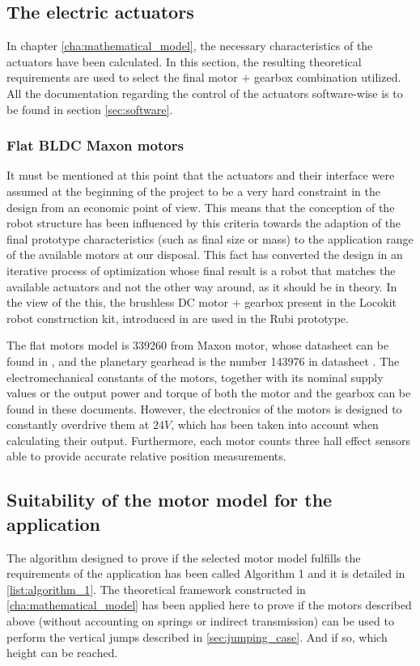 
\subsection{The electric actuators} %
\label{sub:electric_actuators}
In chapter \ref{cha:mathematical_model}, the necessary characteristics of the actuators have been calculated.
In this section, the resulting theoretical requirements are used to select the final motor $+$ gearbox combination utilized.
All the documentation regarding the control of the actuators software-wise is to be found in section \ref{sec:software}.

\subsubsection{Flat BLDC Maxon motors} %
\label{ssub:the_bldc_motors}
It must be mentioned at this point that the actuators and their interface were assumed at the beginning of the project to be a very hard constraint in the design from an economic point of view. 
This means that the conception of the robot structure has been influenced by this criteria towards the adaption of the final prototype characteristics (such as final size or mass) to the application range of the available motors at our disposal.
This fact has converted the design in an iterative process of optimization whose final result is a robot that matches the available actuators and not the other way around, as it should be in theory.
In the view of the this, the brushless DC motor $+$ gearbox present in the Locokit robot construction kit, introduced in \cite{locokit} are used in the Rubi prototype.

The flat motors model is 339260 from Maxon motor, whose datasheet can be found in \cite{maxon_motor}, and the planetary gearhead is the number 143976 in datasheet \cite{maxon_gear}.
The electromechanical constants of the motors, together with its nominal supply values or the output power and torque of both the motor and the gearbox can be found in these documents. 
However, the electronics of the motors is designed to constantly overdrive them at $24V$, which has been taken into account when calculating their output.
Furthermore, each motor counts three hall effect sensors able to provide accurate relative position measurements.


\subsection{Suitability of the motor model for the application} %
\label{sub:suitability_of_the_motor_model_for_the_application}
The algorithm designed to prove if the selected motor model fulfills the requirements of the application has been called Algorithm 1 and it is detailed in \ref{list:algorithm_1}.
The theoretical framework constructed in \ref{cha:mathematical_model} has been applied here to prove if the motors described above (without accounting on springs or indirect transmission) can be used to perform the vertical jumps described in \ref{sec:jumping_case}.
And if so, which height can be reached.

